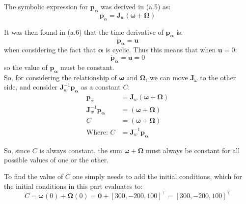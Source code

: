 \documentclass[titlepage]{article}
\begin{document}
The symbolic expression for $\boldsymbol{p}_{\boldsymbol{\alpha}}$ was derived in (a.5) as:
\begin{equation}
	\boldsymbol{p}_{\alpha}=\boldsymbol{J}_w\left(\boldsymbol{\omega}+\boldsymbol{\Omega}\right)
\end{equation}

It was then found in (a.6) that the time derivative of $\boldsymbol{p}_{\boldsymbol{\alpha}}$ is:
\begin{equation}
	\dot{\boldsymbol{p}}_{\boldsymbol{\alpha}}=\boldsymbol{u}
\end{equation}
when considering the fact that $\boldsymbol{\alpha}$ is cyclic. Thus this means that when $\boldsymbol{u}=0$:
\begin{equation}
	\dot{\boldsymbol{p}}_{\boldsymbol{\alpha}}=\boldsymbol{u}=0
\end{equation}
so the value of $\boldsymbol{p}_{\boldsymbol{\alpha}}$ must be constant.\\

So, for considering the relationship of $\boldsymbol{\omega}$ and $\boldsymbol{\Omega}$, we can move $\boldsymbol{J}_\omega$ to the other side, and consider $\boldsymbol{J}_w^{-1}\boldsymbol{p}_{\boldsymbol{\alpha}}$ as a constant $C$:
\begin{equation}
	\begin{split}
		\boldsymbol{p}_{\alpha}&=\boldsymbol{J}_w\left(\boldsymbol{\omega}+\boldsymbol{\Omega}\right) \\ \boldsymbol{J}_w^{-1}\boldsymbol{p}_{\boldsymbol{\alpha}}&=\left(\boldsymbol{\omega}+\boldsymbol{\Omega}\right) \\
		C&=\left(\boldsymbol{\omega}+\boldsymbol{\Omega}\right) \\
		\text{Where: }C&=\boldsymbol{J}_w^{-1}\boldsymbol{p}_{\boldsymbol{\alpha}}
	\end{split}
\end{equation}

\begin{mdframed}
	So, since $C$ is always constant, the sum $\boldsymbol{\omega}+\boldsymbol{\Omega}$ must always be constant for all possible values of one or the other. 
\end{mdframed}

To find the value of $C$ one simply needs to add the initial conditions, which for the initial conditions in this part evaluates to:
\begin{equation}
	C=\boldsymbol{\omega}(0)+\boldsymbol{\Omega}(0)=\boldsymbol{0}+\left[300,-200,100\right]^\top=\left[300,-200,100\right]^\top
\end{equation}
\end{document}
